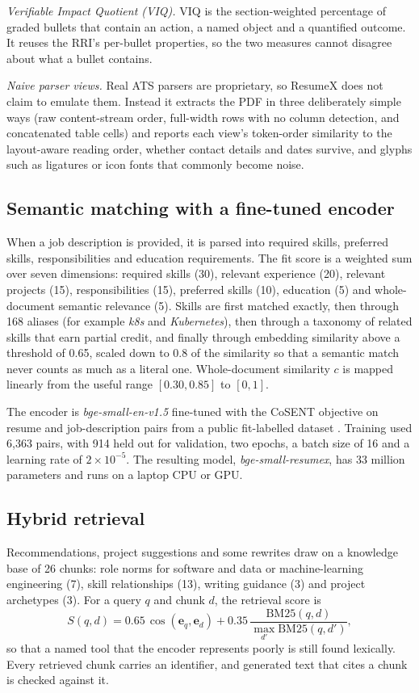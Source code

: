 \documentclass[3p,times,procedia]{elsarticle}
\begin{document}
\textit{Verifiable Impact Quotient (VIQ).} VIQ is the section-weighted percentage of graded bullets that contain an action, a named object and a quantified outcome. It reuses the RRI's per-bullet properties, so the two measures cannot disagree about what a bullet contains.

\textit{Naive parser views.} Real ATS parsers are proprietary, so ResumeX does not claim to emulate them. Instead it extracts the PDF in three deliberately simple ways (raw content-stream order, full-width rows with no column detection, and concatenated table cells) and reports each view's token-order similarity to the layout-aware reading order, whether contact details and dates survive, and glyphs such as ligatures or icon fonts that commonly become noise.

\subsection{Semantic matching with a fine-tuned encoder}
When a job description is provided, it is parsed into required skills, preferred skills, responsibilities and education requirements. The fit score is a weighted sum over seven dimensions: required skills (30), relevant experience (20), relevant projects (15), responsibilities (15), preferred skills (10), education (5) and whole-document semantic relevance (5). Skills are first matched exactly, then through 168 aliases (for example \textit{k8s} and \textit{Kubernetes}), then through a taxonomy of related skills that earn partial credit, and finally through embedding similarity above a threshold of 0.65, scaled down to 0.8 of the similarity so that a semantic match never counts as much as a literal one. Whole-document similarity $c$ is mapped linearly from the useful range $[0.30, 0.85]$ to $[0,1]$.

The encoder is \textit{bge-small-en-v1.5} \cite{xiao2023cpack} fine-tuned with the CoSENT objective \cite{su2022cosent} on resume and job-description pairs from a public fit-labelled dataset \cite{resumefit}. Training used 6,363 pairs, with 914 held out for validation, two epochs, a batch size of 16 and a learning rate of $2\times10^{-5}$. The resulting model, \textit{bge-small-resumex}, has 33 million parameters and runs on a laptop CPU or GPU.

\subsection{Hybrid retrieval}
Recommendations, project suggestions and some rewrites draw on a knowledge base of 26 chunks: role norms for software and data or machine-learning engineering (7), skill relationships (13), writing guidance (3) and project archetypes (3). For a query $q$ and chunk $d$, the retrieval score is
\begin{equation}
S(q,d)=0.65\,\cos\!\left(\mathbf{e}_q,\mathbf{e}_d\right)+0.35\,\frac{\mathrm{BM25}(q,d)}{\max_{d'}\mathrm{BM25}(q,d')},
\end{equation}
so that a named tool that the encoder represents poorly is still found lexically. Every retrieved chunk carries an identifier, and generated text that cites a chunk is checked against it.
\end{document}
